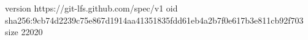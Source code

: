 version https://git-lfs.github.com/spec/v1
oid sha256:9cb74d2239c75e867d1914aa41351835fdd61eb4a2b7f0e617b3e811cb92f703
size 22020

